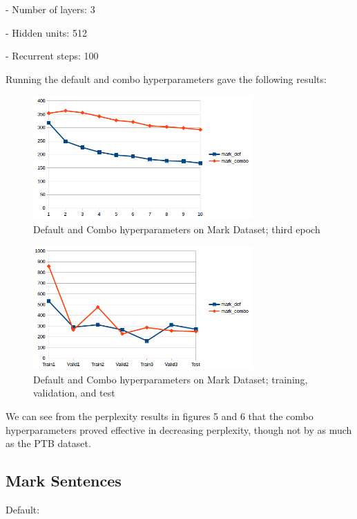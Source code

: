 \documentclass[10pt,a4paper]{article}
\begin{document}
- Number of layers: 3


- Hidden units: 512


- Recurrent steps: 100


Running the default and combo hyperparameters gave the following results:



\begin{figure}[H]
  \begin{center}
    \includegraphics[width=0.75\textwidth] {mark1.png}
    \caption{Default and Combo hyperparameters on Mark Dataset; third epoch}
  \end{center}
\end{figure}

\begin{figure}[H]
  \begin{center}
    \includegraphics[width=0.75\textwidth] {mark2.png}
    \caption{Default and Combo hyperparameters on Mark Dataset; training, validation, and test}
  \end{center}
\end{figure}

We can see from the perplexity results in figures 5 and 6 that the combo hyperparameters proved effective in decreasing perplexity, though not by as much as the PTB dataset.

\subsection{Mark Sentences}
Default:
\end{document}

